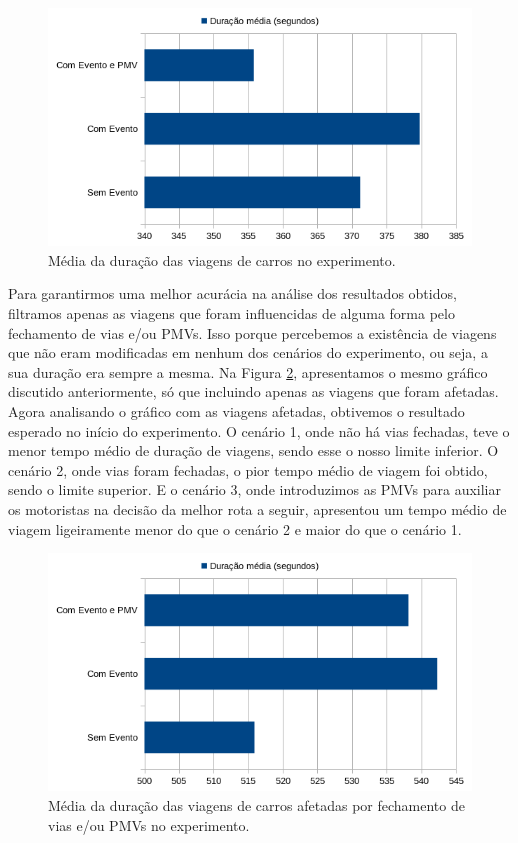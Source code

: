 \begin{figure}[ht]
	\centering
	\includegraphics[width=\textwidth]{figuras/duracao_total.png}
	\caption{Média da duração das viagens de carros no experimento.}
	\label{fig:duracao_total}
\end{figure}

Para garantirmos uma melhor acurácia na análise dos resultados obtidos, filtramos apenas as viagens que foram influencidas de alguma forma pelo fechamento de vias e/ou PMVs.
Isso porque percebemos a existência de viagens que não eram modificadas em nenhum dos cenários do experimento, ou seja, a sua duração era sempre a mesma.
Na Figura \ref{fig:duracao_filtered}, apresentamos o mesmo gráfico discutido anteriormente, só que incluindo apenas as viagens que foram afetadas.
Agora analisando o gráfico com as viagens afetadas, obtivemos o resultado esperado no início do experimento.
O cenário 1, onde não há vias fechadas, teve o menor tempo médio de duração de viagens, sendo esse o nosso limite inferior.
O cenário 2, onde vias foram fechadas, o pior tempo médio de viagem foi obtido, sendo o limite superior.
E o cenário 3, onde introduzimos as PMVs para auxiliar os motoristas na decisão da melhor rota a seguir, apresentou um tempo médio de viagem ligeiramente menor do que o cenário 2 e maior do que o cenário 1.

\begin{figure}[ht]
	\centering
	\includegraphics[width=\textwidth]{figuras/duracao_filtered.png}
	\caption{Média da duração das viagens de carros afetadas por fechamento de vias e/ou PMVs no experimento.}
	\label{fig:duracao_filtered}
\end{figure}

